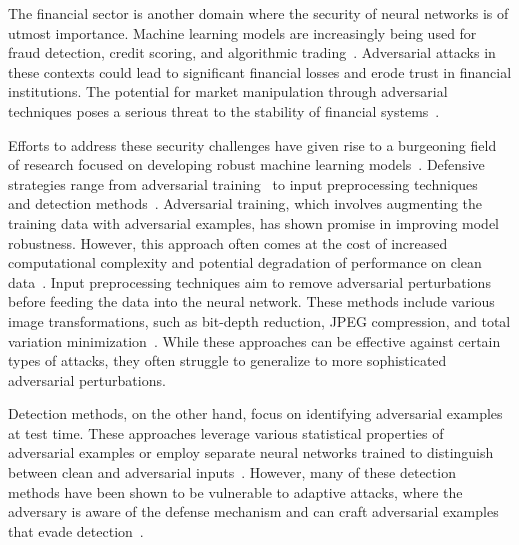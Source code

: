 The financial sector is another domain where the security of neural networks is of utmost importance.
Machine learning models are increasingly being used for fraud detection, credit scoring, and algorithmic trading~\cite{gu2018adversarial}.
Adversarial attacks in these contexts could lead to significant financial losses and erode trust in financial institutions.
The potential for market manipulation through adversarial techniques poses a serious threat to the stability of financial systems~\cite{li2020adversarial}.

Efforts to address these security challenges have given rise to a burgeoning field of research focused on developing robust machine learning models~\cite{madry2017towards}.
Defensive strategies range from adversarial training~\cite{tramer2017ensemble} to input preprocessing techniques~\cite{guo2017countering} and detection methods~\cite{metzen2017detecting}.
Adversarial training, which involves augmenting the training data with adversarial examples, has shown promise in improving model robustness.
However, this approach often comes at the cost of increased computational complexity and potential degradation of performance on clean data~\cite{tsipras2018robustness}.
Input preprocessing techniques aim to remove adversarial perturbations before feeding the data into the neural network.
These methods include various image transformations, such as bit-depth reduction, JPEG compression, and total variation minimization~\cite{xu2017feature}.
While these approaches can be effective against certain types of attacks, they often struggle to generalize to more sophisticated adversarial perturbations.

Detection methods, on the other hand, focus on identifying adversarial examples at test time.
These approaches leverage various statistical properties of adversarial examples or employ separate neural networks trained to distinguish between clean and adversarial inputs~\cite{meng2017magnet}.
However, many of these detection methods have been shown to be vulnerable to adaptive attacks, where the adversary is aware of the defense mechanism and can craft adversarial examples that evade detection~\cite{athalye2018obfuscated}.

